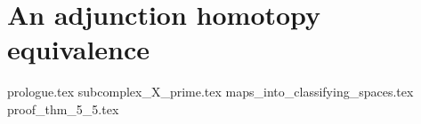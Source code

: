\documentclass[class=article, crop=false]{standalone}
\begin{document}
\chapter{An adjunction homotopy equivalence}	

{prologue.tex}
{subcomplex_X_prime.tex}
{maps_into_classifying_spaces.tex}
{proof_thm_5_5.tex}
\end{document}
